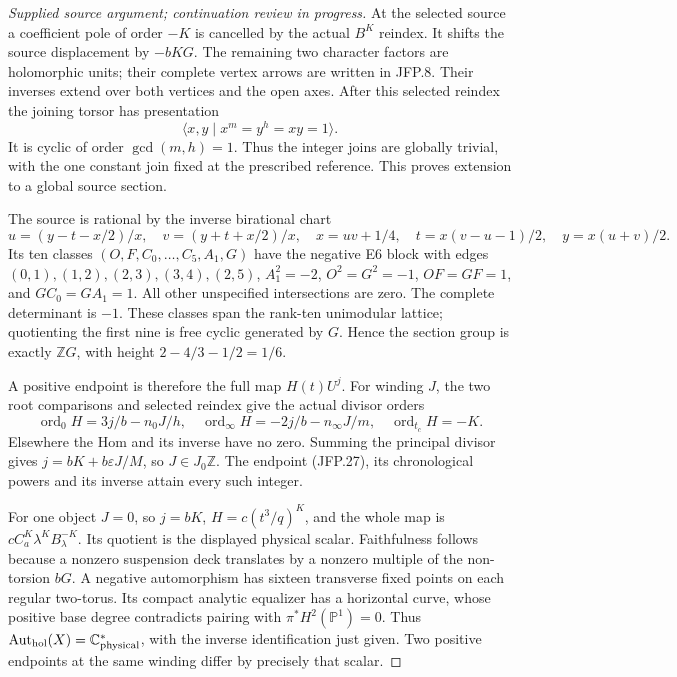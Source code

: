 \begin{proof}[Supplied source argument; continuation review in progress]
At the selected source a coefficient pole of order \(-K\)
is cancelled by the actual \(B^K\) reindex. It shifts the source
displacement by \(-bKG\). The remaining two character factors
are holomorphic units; their complete vertex arrows are written
in JFP.8. Their inverses extend over both vertices and the open
axes. After this selected reindex the joining torsor has
presentation
\[
 \langle x,y\mid x^m=y^h=xy=1\rangle.
\tag{JFP.32}
\]
It is cyclic of order \(\gcd(m,h)=1\). Thus the integer joins
are globally trivial, with the one constant join fixed at the
prescribed reference. This proves extension to a global source
section.

The source is rational by the inverse birational chart
\[
 u=(y-t-x/2)/x,\quad v=(y+t+x/2)/x,\quad
 x=uv+1/4,\quad t=x(v-u-1)/2,\quad y=x(u+v)/2.
\tag{JFP.33}
\]
Its ten classes \((O,F,C_0,\ldots,C_5,A_1,G)\) have the
negative E6 block with edges \((0,1),\allowbreak(1,2),\allowbreak(2,3),\allowbreak(3,4),\allowbreak(2,5)\),
\(A_1^2=-2\), \(O^2=G^2=-1\), \(OF=GF=1\), and
\(GC_0=GA_1=1\). All other unspecified intersections are zero.
The complete determinant is \(-1\). These classes span the
rank-ten unimodular lattice; quotienting the first nine is free
cyclic generated by \(G\). Hence the section group is exactly
\(\mathbb ZG\), with height \(2-4/3-1/2=1/6\).

A positive endpoint is therefore the full map \(H(t)U^j\).
For winding \(J\), the two root comparisons and selected reindex
give the actual divisor orders
\[
 \operatorname{ord}_0H=3j/b-n_0J/h,\quad
 \operatorname{ord}_\infty H=-2j/b-n_\infty J/m,\quad
 \operatorname{ord}_{t_c}H=-K.
\tag{JFP.34}
\]
Elsewhere the Hom and its inverse have no zero. Summing the
principal divisor gives
\(j=bK+b\varepsilon J/M\), so \(J\in J_0\mathbb Z\).
The endpoint (JFP.27), its chronological powers and its inverse
attain every such integer.

For one object \(J=0\), so \(j=bK\),
\(H=c(t^3/q)^K\), and the whole map is
\(cC_a^K\lambda^KB_\lambda^{-K}\). Its quotient is the
displayed physical scalar. Faithfulness follows because a
nonzero suspension deck translates by a nonzero multiple of
the non-torsion \(bG\). A negative automorphism has sixteen
transverse fixed points on each regular two-torus. Its compact
analytic equalizer has a horizontal curve, whose positive base
degree contradicts pairing with \(\pi^*H^2(\mathbb P^1)=0\).
Thus \(\operatorname{Aut}_{\rm hol}(X)=\mathbb C^*_{\rm physical}\),
with the inverse identification just given. Two positive
endpoints at the same winding differ by precisely that scalar.


\end{proof}
